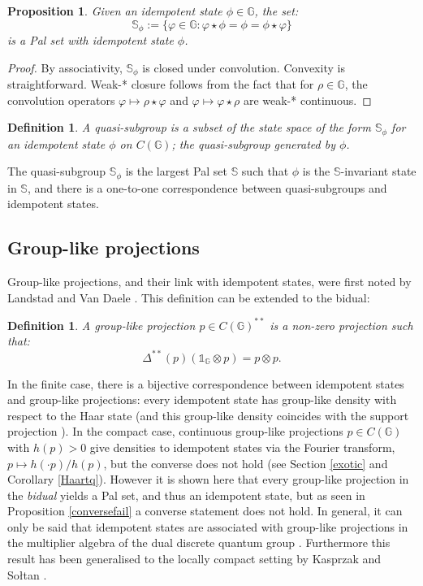 \documentclass[12pt]{amsart}
\newtheorem{definition}[theorem]{Definition}
\newtheorem{proposition}[theorem]{Proposition}
\theoremstyle{remark}
\theoremstyle{remark}
\begin{document}
\begin{proposition}
Given an idempotent state $\phi\in \mathbb{G}$, the set:
  \begin{equation}
  \mathbb{S}_{\phi}:=\{\varphi\in\mathbb{G}\colon \varphi\star\phi=\phi=\phi\star \varphi\}\end{equation}
  is a Pal set   with idempotent state $\phi$.
\end{proposition}
\begin{proof}
 By associativity, $\mathbb{S}_{\phi}$ is closed under convolution. Convexity is straightforward. Weak-* closure follows from the fact that for $\rho\in \mathbb{G}$, the convolution operators $\varphi\mapsto \rho\star \varphi$ and $\varphi\mapsto \varphi\star \rho$ are weak-* continuous.
\end{proof}
\begin{definition}
A \emph{quasi-subgroup} is a subset of the state space of the form $\mathbb{S}_{\phi}$ for an idempotent state $\phi$ on $C(\mathbb{G})$; the \emph{quasi-subgroup generated by $\phi$.}
\end{definition}
The quasi-subgroup $\mathbb{S}_{\phi}$ is the largest Pal set $\mathbb{S}$ such that $\phi$ is the $\mathbb{S}$-invariant state in $\mathbb{S}$, and there is a one-to-one correspondence between quasi-subgroups and idempotent states.


\subsection{Group-like projections}
Group-like projections, and their link with idempotent states, were first noted by Landstad and Van Daele \cite{lvd}. This definition can be extended to the bidual:
\begin{definition}
A group-like projection $p\in C(\mathbb{G})^{**}$ is a non-zero projection such that:
$$\Delta^{**}(p)(\mathds{1}_{\mathbb{G}}\otimes p)=p\otimes p.$$
\end{definition}


 In the finite case, there is a bijective correspondence between idempotent states and group-like projections: every idempotent state has group-like density with respect to the Haar state \cite{frs} (and this group-like density coincides with the support projection \cite{mcc}). In the compact case, continuous group-like projections $p\in C(\mathbb{G})$ with $h(p)>0$ give densities to idempotent states via the Fourier transform, $p\mapsto h(\cdot p)/h(p)$, but the converse does not hold (see Section \ref{exotic} and Corollary \ref{Haartq}). However  it is shown here  that every group-like projection in the \emph{bidual} yields a Pal set, and thus an idempotent state, but as seen in Proposition \ref{conversefail} a converse statement does not hold.   In general, it can only be said that idempotent states are associated with group-like projections in the multiplier algebra of the dual discrete quantum group \cite{frs}. Furthermore this result has been generalised to the locally compact setting by Kasprzak and So{\l}tan \cite{kap}.
\end{document}
